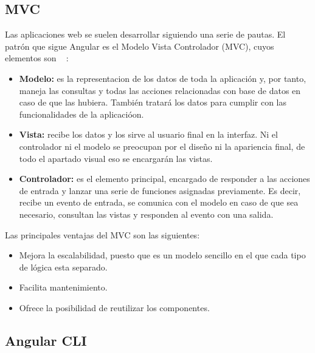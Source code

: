 \documentclass[a4paper, 12pt]{book}
\begin{document}
\subsection{MVC} 
\label{sec:mvc}

Las aplicaciones web se suelen desarrollar siguiendo una serie de pautas. El patrón que sigue Angular es el Modelo Vista Controlador (MVC), cuyos elementos son ~\cite{mvc} :

\begin{itemize}
  
	\item \textbf{Modelo:} es la representacion de los datos de toda la aplicación y, por tanto, maneja las consultas y todas las acciones relacionadas con base de datos en caso de que las hubiera. También tratará los datos para cumplir con las funcionalidades de la aplicacióon.
 
	\item \textbf{Vista:} recibe los datos y los sirve al usuario final en la interfaz. Ni el controlador ni el modelo se preocupan por el diseño ni la apariencia final, de todo el apartado visual eso se encargarán las vistas.

	\item \textbf{Controlador:} es el elemento principal, encargado de responder a las acciones de entrada y lanzar una serie de funciones asignadas previamente. Es decir, recibe un evento de entrada, se comunica con el modelo en caso de que sea necesario, consultan las vistas y responden al evento con una salida.

\end{itemize}

Las principales ventajas del MVC son las siguientes:

\begin{itemize}
  
	\item Mejora la escalabilidad, puesto que es un modelo sencillo en el que cada tipo de lógica esta separado.
 
	\item Facilita mantenimiento.

	\item Ofrece la posibilidad de reutilizar los componentes.

\end{itemize}

\subsection{Angular CLI} 
\label{sec:angularcli}
\end{document}
